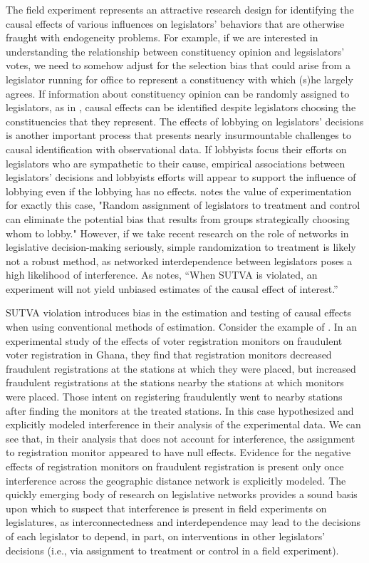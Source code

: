 \documentclass[12pt]{article}
\begin{document}
The field experiment represents an attractive research design for identifying the causal effects of various influences on legislators' behaviors that are otherwise fraught with endogeneity problems. For example, if we are interested in understanding the relationship between constituency opinion and legsislators' votes, we need to somehow adjust for the selection bias that could arise from a legislator running for office to represent a constituency with which (s)he largely agrees. If information about constituency opinion can be randomly assigned to legislators, as in \citet{butler2011can}, causal effects can be identified despite legislators choosing the constituencies that they represent. The effects of lobbying on legislators' decisions is another important process that presents nearly insurmountable challenges to causal identification with observational data. If lobbyists focus their efforts on legislators who are sympathetic to their cause, empirical associations between legislators' decisions and lobbyists efforts will appear to support the influence of lobbying even if the lobbying has no effects. \citet[p. 331]{bergan2009does} notes the value of experimentation for exactly this case, "Random assignment of legislators to treatment and control can eliminate
the potential bias that results from groups strategically choosing whom to lobby." However, if we take recent research on the role of networks in legislative decision-making seriously, simple randomization to treatment is likely not a robust method, as networked interdependence between legislators poses a high likelihood of interference.  As \citet[p. 5]{sekhon2008} notes, ``When SUTVA is violated, an experiment will not yield unbiased estimates of the causal effect of interest.''  

SUTVA violation introduces bias in the estimation and testing of causal effects when using conventional methods of estimation. Consider the example of \citet{Ichino:2012}. In an experimental study of the effects of voter registration monitors on fraudulent voter registration in Ghana, they find that registration monitors decreased fraudulent registrations at the stations at which they were placed, but increased fraudulent registrations at the stations nearby the stations at which monitors were placed. Those intent on registering fraudulently went to nearby stations after finding the monitors at the treated stations. In this case \citet{Ichino:2012} hypothesized and explicitly modeled interference in their analysis of the experimental data.  We can see that, in their analysis that does not account for interference, the assignment to registration monitor appeared to have null effects. Evidence for the negative effects of registration monitors on fraudulent registration is present only once interference across the geographic distance network is explicitly modeled. The quickly emerging body of research on legislative networks provides a sound basis upon which to suspect that interference is present in field experiments on legislatures, as interconnectedness and interdependence may lead to the decisions of each legislator to depend, in part, on interventions in other legislators' decisions (i.e., via assignment to treatment or control in a field experiment). 
\end{document}
